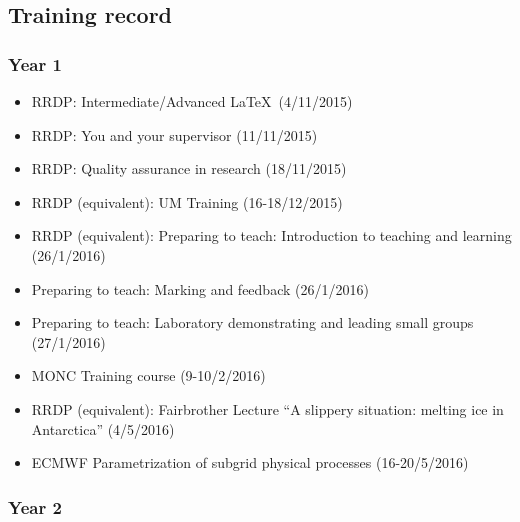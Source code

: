 \documentclass[11pt,a4paper]{article}
\begin{document}
%

\subsection*{Training record}
\subsubsection*{Year 1}

\begin{itemize}
  \item RRDP: Intermediate/Advanced \LaTeX\ (4/11/2015)
  \item RRDP: You and your supervisor (11/11/2015)
  \item RRDP: Quality assurance in research (18/11/2015)
  \item RRDP (equivalent): UM Training (16-18/12/2015)
  \item RRDP (equivalent): Preparing to teach: Introduction to teaching and learning (26/1/2016)
  \item Preparing to teach: Marking and feedback (26/1/2016)
  \item Preparing to teach: Laboratory demonstrating and leading small groups (27/1/2016)
  \item MONC Training course (9-10/2/2016)
  \item RRDP (equivalent): Fairbrother Lecture ``A slippery situation: melting ice in Antarctica'' (4/5/2016)
  \item ECMWF Parametrization of subgrid physical processes (16-20/5/2016)
\end{itemize}

\subsubsection*{Year 2}
\end{document}
